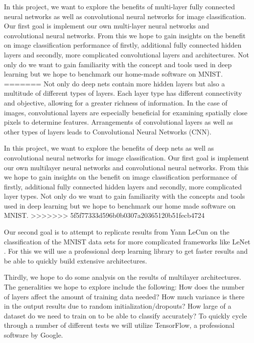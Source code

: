 \documentclass[12pt, twocolumn]{article}
\begin{document}
In this project, we want to explore the benefits of multi-layer fully connected neural networks as well as convolutional neural networks for image classification. Our first goal is implement our own multi-layer neural networks and convolutional neural networks. From this we hope to gain insights on the benefit on image classification performance of firstly, additional fully connected hidden layers and secondly, more complicated convolutional layers and architectures.  Not only do we want to gain familiarity with the concept and tools used in deep learning but we hope to benchmark our home-made software on MNIST. 
=======
Not only do deep nets contain more hidden layers but also a multitude of different types of layers. Each layer type has different connectivity and objective, allowing for a greater richness of information. In the case of images, convolutional layers are especially beneficial for examining spatially close pixels to determine features. Arrangements of convolutional layers as well as other types of layers leads to Convolutional Neural Networks (CNN). 

In this project, we want to explore the benefits of deep nets as well as convolutional neural networks for image classification.  Our first goal is implement our own multilayer neural networks and convolutional neural networks. From this we hope to gain insights on the benefit on image classification performance of firstly, additional fully connected hidden layers and secondly, more complicated layer types.  Not only do we want to gain familiarity with the concepts and tools used in deep learning but we hope to benchmark our home made software on MNIST. 
>>>>>>> 5f5f77333d596b0b0307a20365120b51fecb4724

Our second goal is to attempt to replicate results from Yann LeCun on the classification of the MNIST data sets for more complicated frameworks like LeNet \cite{LeCun1998}. For this we will use a professional deep learning library to get faster results and be able to quickly build extensive architectures. 

Thirdly, we hope to do some analysis on the results of multilayer architectures. The generalities we hope to explore include the following: How does the number of layers affect the amount of training data needed?  How much variance is there in the output results due to random initialization/dropouts? How large of a dataset do we need to train on to be able to classify accurately?  To quickly cycle through a number of different tests we will utilize TensorFlow, a professional software by Google.
\end{document}
